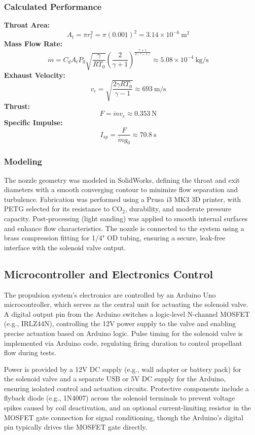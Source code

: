 \documentclass{new-aiaa}
\begin{document}
\subsubsection{Calculated Performance}
\noindent\textbf{Throat Area:}
\[
A_t = \pi r_t^2 = \pi (0.001)^2 = 3.14 \times 10^{-6} \ \text{m}^2
\]
\noindent\textbf{Mass Flow Rate:}
\[
\dot{m} = C_d A_t P_0 \sqrt{\frac{\gamma}{R T_0}} \left( \frac{2}{\gamma+1} \right)^{\frac{\gamma+1}{2(\gamma-1)}} \approx 5.08 \times 10^{-4} \ \text{kg/s}
\]
\noindent\textbf{Exhaust Velocity:}
\[
v_e = \sqrt{\frac{2 \gamma R T_0}{\gamma - 1}} \approx 693 \ \text{m/s}
\]
\noindent\textbf{Thrust:}
\[
F = \dot{m} v_e \approx 0.353 \ \text{N}
\]
\noindent\textbf{Specific Impulse:}
\[
I_{sp} = \frac{F}{\dot{m} g_0} \approx 70.8 \ \text{s}
\]

\subsubsection{Modeling}
The nozzle geometry was modeled in SolidWorks, defining the throat and exit diameters with a smooth converging contour to minimize flow separation and turbulence. Fabrication was performed using a Prusa i3 MK3 3D printer, with PETG selected for its resistance to CO$_2$, durability, and moderate pressure capacity. Post-processing (light sanding) was applied to smooth internal surfaces and enhance flow characteristics. The nozzle is connected to the system using a brass compression fitting for 1/4" OD tubing, ensuring a secure, leak-free interface with the solenoid valve output.



\subsection{Microcontroller and Electronics Control}

The propulsion system’s electronics are controlled by an Arduino Uno microcontroller, which serves as the central unit for actuating the solenoid valve. A digital output pin from the Arduino switches a logic-level N-channel MOSFET (e.g., IRLZ44N), controlling the 12V power supply to the valve and enabling precise actuation based on Arduino logic. Pulse timing for the solenoid valve is implemented via Arduino code, regulating firing duration to control propellant flow during tests.

Power is provided by a 12V DC supply (e.g., wall adapter or battery pack) for the solenoid valve and a separate USB or 5V DC supply for the Arduino, ensuring isolated control and actuation circuits. Protective components include a flyback diode (e.g., 1N4007) across the solenoid terminals to prevent voltage spikes caused by coil deactivation, and an optional current-limiting resistor in the MOSFET gate connection for signal conditioning, though the Arduino’s digital pin typically drives the MOSFET gate directly.
\end{document}
